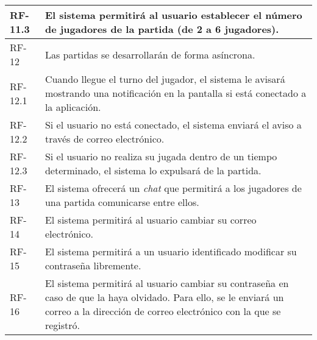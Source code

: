 \documentclass[11pt, a4paper, titlepage]{article}
\begin{document}
\begin{longtable}[h!]{| p{} | p{} |}
         \hline
         RF-11.3 & El sistema permitirá al usuario establecer el número de jugadores de la partida (de 2 a 6 jugadores).\\
         \hline
         RF-12 & Las partidas se desarrollarán de forma asíncrona.\\
         \hline
         RF-12.1 & Cuando llegue el turno del jugador, el sistema le avisará mostrando una notificación en la pantalla si está conectado a la aplicación.\\
         \hline
         RF-12.2 & Si el usuario no está conectado, el sistema enviará el aviso a través de correo electrónico.\\
         \hline
         RF-12.3 & Si el usuario no realiza su jugada dentro de un tiempo determinado, el sistema lo expulsará de la partida.\\
         \hline
         RF-13 & El sistema ofrecerá un \textit{chat} que permitirá a los jugadores de una partida comunicarse entre ellos.\\
         \hline
         RF-14 & El sistema permitirá al usuario cambiar su correo electrónico.\\
         \hline
         RF-15 & El sistema permitirá a un usuario identificado modificar su contraseña libremente.\\
         \hline
         RF-16 & El sistema permitirá al usuario cambiar su contraseña en caso de que la haya olvidado. Para ello, se le enviará un correo a la dirección de correo electrónico con la que se registró.\\
         \hline
\end{longtable}
\end{document}
